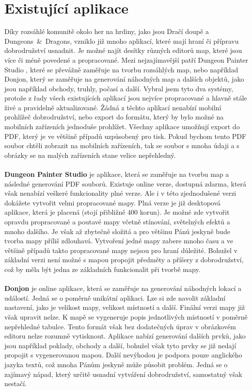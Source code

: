 \documentclass[thesis=B,czech]{resources/FITthesis}[2012/06/26]
\begin{document}
	\section{Existující aplikace}
Díky rozsáhlé komunitě okolo her na hrdiny, jako jsou Dračí doupě a Dungeons~\&~Dragons, vzniklo již mnoho aplikací, které mají hraní či přípravu dobrodružství usnadnit. Je možné najít desítky různých editorů map, které jsou více či méně povedené a propracované. Mezi nejzajímavější patří  Dungeon Painter Studio \cite{dungeoPainterStudio}, které se převážně zaměřuje na tvorbu rozsáhlých map, nebo například Donjon\cite{donjon}, který se zaměřuje na generování náhodných map a dalších objektů, jako jsou například obchody, truhly, počasí a další. Vybral jsem tyto dva systémy, protože z řady všech existujících aplikací jsou nejvíce propracované a hlavně stále živé a pravidelně aktualizované. Žádná z těchto aplikací nenabízí mobilní prohlížeč dobrodružství, nebo export do formátu, který by bylo možné na mobilních zařízeních jednoduše prohlížet. Všechny aplikace umožňují export do PDF, který je ve většině případů uzpůsobený pro tisk. Pokud bychom tento PDF soubor chtěli zobrazit na mobilních zařízeních, tak se soubor s mnoha údaji a s obrázky se na malých zařízeních stane velice nepřehledný. \\
\\
\textbf{Dungeon Painter Studio} je aplikace, která se zaměřuje na tvorbu map a následné generování PDF souborů. Existuje online verze, dostupná zdarma, která však nenabízí veškeré funkcionality plné verze. Ale i v této zjednodušené verzi dokážete vytvořit velmi propracované mapy. Plná verze je již desktopová aplikace, která je placená (stojí  přibližně 400 korun). Je možné zde vytvořit opravdu propracované a poutavé mapy včetně stínování, světelných efektů a mnoho dalšího. Je však až zbytečně složitá a pro většinu Pánů jeskyně bude tvorba mapy příliš zdlouhavá. Vytvoření jedné mapy zabere mnoho času a ve většině případů takto propracované mapy nejsou pro hraní důležité. Bohužel v základní verzi není možné s mapou propojit předměty a příšery z dobrodružství, což by měla být jedna ze základních funkcionalit při tvorbě mapy.\\
\\
\textbf{Donjon} je online aplikace, která se zaměřuje na generování náhodných lokací a událostí. Jedná se o poměrně unikátní aplikaci. Lze si zde navolit základní nastavení, jako je velikost mapy, velikost místností a další. Finální verzi mapy již však upravit nelze. K mapě se vygeneruje popis jednotlivých místností v poměrně nepřehledné tabulce. Tento formát však bez dodatečných úprav v obrázkovém editoru nelze rozumně vytisknout. Aplikace nabízí generování dalších prvků, jako jsou například poklady, obchody a další, bohužel však tyto prvky se již nedají propojit s vygenerovanou mapou. Další nevýhodou je podpora pouze anglického jazyka textů, což mnoha Pánům jeskyně může působit problém. Jedná se o zajímavý nápad, který určitě usnadní vytváření dobrodružství, samostatný však nestačí.
\end{document}
